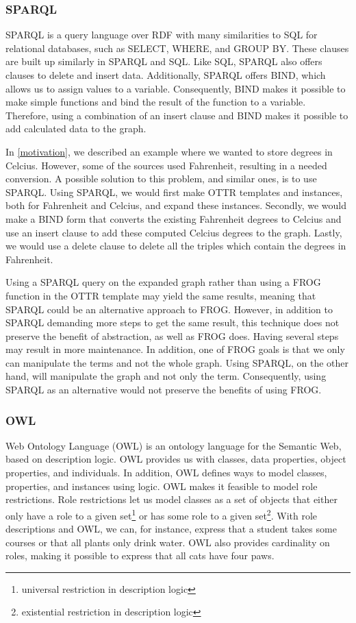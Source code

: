 \subsubsection{SPARQL}
SPARQL \autocite{SPARQL} is a query language over RDF with many similarities to SQL for relational databases, such as SELECT, WHERE, and GROUP BY. These clauses are built up similarly in SPARQL and SQL. Like SQL, SPARQL also offers clauses to delete and insert data. Additionally, SPARQL offers BIND, which allows us to assign values to a variable. Consequently, BIND makes it possible to make simple functions and bind the result of the function to a variable. Therefore, using a combination of an insert clause and BIND makes it possible to add calculated data to the graph.

\para
In \autoref{motivation}, we described an example where we wanted to store degrees in Celcius. However, some of the sources used Fahrenheit, resulting in a needed conversion. A possible solution to this problem, and similar ones, is to use SPARQL. Using SPARQL, we would first make OTTR templates and instances, both for Fahrenheit and Celcius, and expand these instances. Secondly, we would make a BIND form that converts the existing Fahrenheit degrees to Celcius and use an insert clause to add these computed Celcius degrees to the graph. Lastly, we would use a delete clause to delete all the triples which contain the degrees in Fahrenheit.

\para
Using a SPARQL query on the expanded graph rather than using a FROG function in the OTTR template may yield the same results, meaning that SPARQL could be an alternative approach to FROG. However, in addition to SPARQL demanding more steps to get the same result, this technique does not preserve the benefit of abstraction, as well as FROG does. Having several steps may result in more maintenance. In addition, one of FROG goals is that we only can manipulate the terms and not the whole graph. Using SPARQL, on the other hand, will manipulate the graph and not only the term. Consequently, using SPARQL as an alternative would not preserve the benefits of using FROG.

\subsubsection{OWL}
Web Ontology Language (OWL) \autocite{OWL} is an ontology language for the Semantic Web, based on description logic. OWL provides us with classes, data properties, object properties, and individuals. In addition, OWL defines ways to model classes, properties, and instances using logic. OWL makes it feasible to model role restrictions. Role restrictions let us model classes as a set of objects that either only have a role to a given set\footnote{universal restriction in description logic} or has some role to a given set\footnote{existential restriction in description logic}.  With role descriptions and OWL, we can, for instance, express that a student takes some courses or that all plants only drink water. OWL also provides cardinality on roles, making it possible to express that all cats have four paws.


